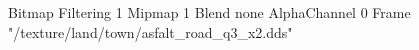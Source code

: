 {Bitmap
	{Filtering 1}
	{Mipmap 1}
	{Blend none}
	{AlphaChannel 0}
	{Frame "/texture/land/town/asfalt_road_q3_x2.dds"}
}
